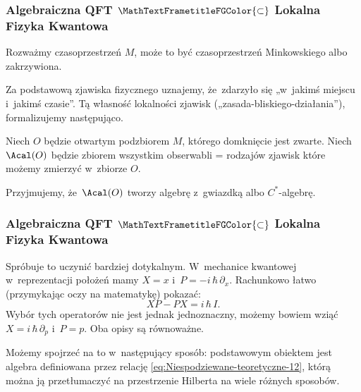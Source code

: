 \documentclass[10pt,t]{beamer}
\begin{document}
\begin{frame}
  \frametitle{Algebraiczna QFT $\MathTextFrametitleFGColor{\subset}$
    Lokalna Fizyka Kwantowa}


  Rozważmy czasoprzestrzeń $M$, może to być czasoprzestrzeń
  Minkowskiego albo zakrzywiona.

  Za podstawową zjawiska fizycznego uznajemy, że~zdarzyło się
  „w~jakimś miejscu i~jakimś czasie”. Tą własność lokalności zjawisk
  („zasada-bliskiego-działania”), formalizujemy następująco.

  Niech $O$ będzie otwartym podzbiorem $M$, którego domknięcie jest
  zwarte. Niech $\Acal( O )$ będzie zbiorem wszystkim obserwabli
  = rodzajów zjawisk które możemy zmierzyć w~zbiorze $O$.

  Przyjmujemy, że~$\Acal( O )$ tworzy algebrę z~gwiazdką albo
  $C^{ * }$-algebrę.

\end{frame}





\begin{frame}
  \frametitle{Algebraiczna QFT $\MathTextFrametitleFGColor{\subset}$
    Lokalna Fizyka Kwantowa}


  Spróbuje to uczynić bardziej dotykalnym. W~mechanice kwantowej
  w~reprezentacji położeń mamy $X = x$
  i~$P = -i \, \hbar \, \partial_{ x }$. Rachunkowo łatwo (przymykając
  oczy na matematykę) pokazać:
  \begin{equation}
    \label{eq:Niespodziewane-teoretyczne-12}
    X P - P X = i \, \hbar \, I.
  \end{equation}
  Wybór tych operatorów nie jest jednak jednoznaczny, możemy bowiem
  wziąć $X = i \, \hbar \, \partial_{ p }$ i~$P = p$. Oba opisy są
  równoważne.

  Możemy spojrzeć na to w~następujący sposób: podstawowym obiektem
  jest algebra definiowana przez relację
  \eqref{eq:Niespodziewane-teoretyczne-12}, którą można ją
  przetłumaczyć na przestrzenie Hilberta na wiele różnych sposobów.

\end{frame}
\end{document}
